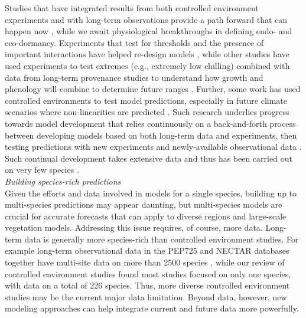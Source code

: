\documentclass[11pt,letter]{article}
\begin{document}
Studies that have integrated results from both controlled environment experiments and with long-term observations provide a path forward that can happen now \citep{Caffarra:2011qf,nagano2012,satake2013,ford2016,chuinearees}, while we await physiological breakthroughs in defining endo- and eco-dormancy. Experiments that test for thresholds and the presence of important interactions have helped re-design models \citep{Caffarra:2011qf,chuinearees}, while other studies have used experiments to test extremes (e.g., extremely low chilling) combined with data from long-term provenance studies to understand how growth and phenology will combine to determine future ranges \citep{ford2016}. Further, some work has used controlled environments to test model predictions, especially in future climate scenarios where non-linearities are predicted \citep[see][]{nagano2012}. Such research underlies progress towards model development that relies continuously on a back-and-forth process between developing models based on both long-term data and experiments, then testing predictions with new experiments and newly-available observational data \citep[i.e., more years and also data from new locations,][]{nagano2012,satake2013}. Such continual development takes extensive data and thus has been carried out on very few species \citep[e.g., \emph{Arabidopsis thaliana}, \emph{Oryza sativa} (rice), \emph{Arabidopsis halleri},][]{Wilczek:2009oa,nagano2012,satake2013}.\\

\emph{Building species-rich predictions}\\
Given the efforts and data involved in models for a single species, building up to multi-species predictions may appear daunting, but multi-species models are crucial for accurate forecasts that can apply to diverse regions and large-scale vegetation models. Addressing this issue requires, of course, more data. Long-term data is generally more species-rich than controlled environment studies. For example long-term observational data in the PEP725 and NECTAR databases together have multi-site data on more than 2500 species \citep{nectar,Templ2018}, while our review of controlled environment studies found most studies focused on only one species, with data on a total of 226 species. Thus, more diverse controlled environment studies may be the current major data limitation. Beyond data, however, new modeling approaches can help integrate current and future data more powerfully. \\
\end{document}

